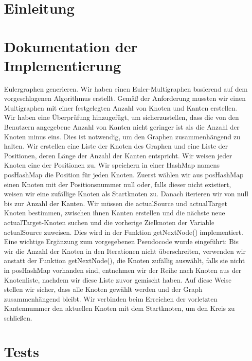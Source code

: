 \documentclass[a4paper]{article}
\begin{document}
	

\newpage

\tableofcontents

\newpage

\section{Einleitung}

\section{Dokumentation der Implementierung}
Eulergraphen generieren.
Wir haben einen Euler-Multigraphen basierend auf dem vorgeschlagenen Algorithmus erstellt. 
Gemäß der Anforderung mussten wir einen Multigraphen mit einer festgelegten Anzahl von Knoten und Kanten erstellen. 
Wir haben eine Überprüfung hinzugefügt, um sicherzustellen, dass die von den Benutzern angegebene Anzahl von Kanten nicht geringer ist als die Anzahl der Knoten minus eins. Dies ist notwendig, um den Graphen zusammenhängend zu halten. 
Wir erstellen eine Liste der Knoten des Graphen und eine Liste der Positionen, deren Länge der Anzahl der Kanten entspricht. Wir weisen jeder Knoten eine der Positionen zu. 
Wir speichern in einer HashMap namens posHashMap die Position für jeden Knoten. 
Zuerst wählen wir aus posHashMap einen Knoten mit der Positionsnummer null oder, falls dieser nicht existiert, weisen wir eine zufällige Knoten als Startknoten zu. 
Danach iterieren wir von null bis zur Anzahl der Kanten. Wir müssen die actualSource und actualTarget Knoten bestimmen, zwischen ihnen Kanten erstellen und die nächste neue actualTarget-Knoten suchen und die vorherige Zielknoten der Variable actualSource zuweisen. Dies wird in der Funktion getNextNode() implementiert. 
Eine wichtige Ergänzung zum vorgegebenen Pseudocode wurde eingeführt: Bis wir die Anzahl der Knoten in den Iterationen nicht überschreiten, verwenden wir anstatt der Funktion getNextNode(), die Knoten zufällig auswählt, falls sie nicht in posHashMap vorhanden sind, entnehmen wir der Reihe nach Knoten aus der Knotenliste, nachdem wir diese Liste zuvor gemischt haben. 
Auf diese Weise stellen wir sicher, dass alle Knoten gewählt werden und der Graph zusammenhängend bleibt. Wir verbinden beim Erreichen der vorletzten Kantennummer den aktuellen Knoten mit dem Startknoten, um den Kreis zu schließen.

\section{Tests}



\end{document}
